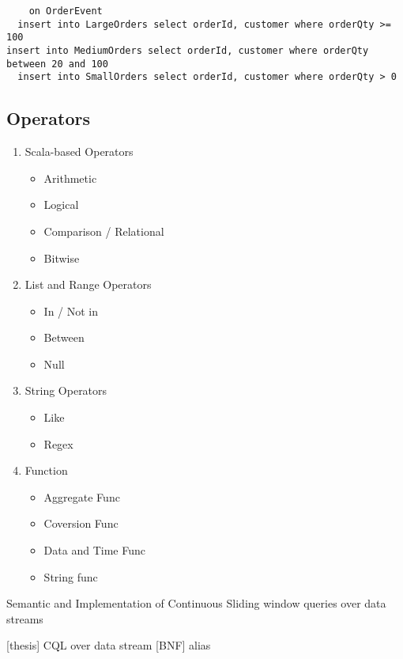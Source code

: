 \begin{verbatim}
	on OrderEvent
  insert into LargeOrders select orderId, customer where orderQty >= 100
insert into MediumOrders select orderId, customer where orderQty between 20 and 100
  insert into SmallOrders select orderId, customer where orderQty > 0
\end{verbatim}


\subsection{Operators}
\begin{enumerate}

\item Scala-based Operators
	\begin{itemize}
        \item Arithmetic
        \item Logical
        \item Comparison / Relational
        \item Bitwise
	\end{itemize}
	
 \item List and Range Operators
 	\begin{itemize}
        \item In / Not in
        \item Between
        \item Null
 	\end{itemize}
 \item String Operators
 	\begin{itemize}
        \item Like
        \item Regex
 	\end{itemize}
 \item Function 
 	\begin{itemize}
        \item Aggregate Func
        \item Coversion Func
       	\item Data and Time Func
        \item String func
 	\end{itemize}

\end{enumerate}
Semantic and Implementation of Continuous Sliding window queries over data streams

[thesis] CQL over data stream [BNF] alias



